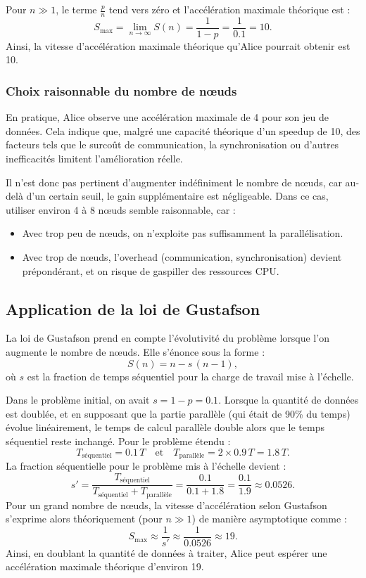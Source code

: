 \documentclass[a4paper,13pt]{book}
\begin{document}
Pour \( n \gg 1 \), le terme \(\frac{p}{n}\) tend vers zéro et l’accélération maximale théorique est :
\[
S_{\max} = \lim_{n\to\infty} S(n) = \frac{1}{1-p} = \frac{1}{0.1} = 10.
\]
Ainsi, la vitesse d’accélération maximale théorique qu’Alice pourrait obtenir est 10.

\subsubsection{Choix raisonnable du nombre de n\oe uds}

En pratique, Alice observe une accélération maximale de 4 pour son jeu de données. Cela indique que, malgré une capacité théorique d’un speedup de 10, des facteurs tels que le surcoût de communication, la synchronisation ou d’autres inefficacités limitent l’amélioration réelle.

Il n’est donc pas pertinent d’augmenter indéfiniment le nombre de nœuds, car au-delà d’un certain seuil, le gain supplémentaire est négligeable. Dans ce cas, utiliser environ 4 à 8 nœuds semble raisonnable, car :
\begin{itemize}
    \item Avec trop peu de nœuds, on n’exploite pas suffisamment la parallélisation.
    \item Avec trop de nœuds, l’overhead (communication, synchronisation) devient prépondérant, et on risque de gaspiller des ressources CPU.
\end{itemize}

\subsection{Application de la loi de Gustafson}

La loi de Gustafson prend en compte l’évolutivité du problème lorsque l’on augmente le nombre de nœuds. Elle s’énonce sous la forme :
\[
S(n) = n - s \,(n-1),
\]
où \(s\) est la fraction de temps séquentiel pour la charge de travail mise à l'échelle.

Dans le problème initial, on avait \(s = 1-p = 0.1\). Lorsque la quantité de données est doublée, et en supposant que la partie parallèle (qui était de 90\% du temps) évolue linéairement, le temps de calcul parallèle double alors que le temps séquentiel reste inchangé. Pour le problème étendu :
\[
T_{\text{séquentiel}} = 0.1\,T \quad \text{et} \quad T_{\text{parallèle}} = 2 \times 0.9\,T = 1.8\,T.
\]
La fraction séquentielle pour le problème mis à l'échelle devient :
\[
s' = \frac{T_{\text{séquentiel}}}{T_{\text{séquentiel}} + T_{\text{parallèle}}} = \frac{0.1}{0.1+1.8} = \frac{0.1}{1.9} \approx 0.0526.
\]
Pour un grand nombre de nœuds, la vitesse d’accélération selon Gustafson s’exprime alors théoriquement (pour \( n \gg 1 \)) de manière asymptotique comme :
\[
S_{\max} \approx \frac{1}{s'} \approx \frac{1}{0.0526} \approx 19.
\]
Ainsi, en doublant la quantité de données à traiter, Alice peut espérer une accélération maximale théorique d’environ 19.
\end{document}
